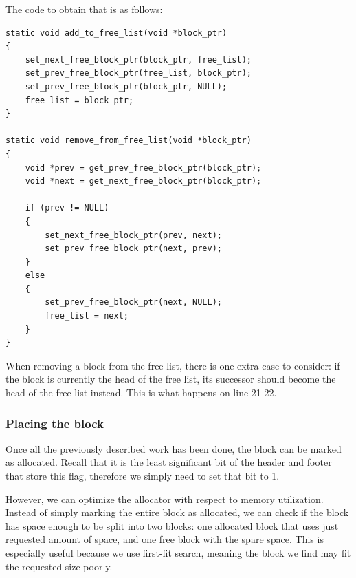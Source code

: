 The code to obtain that is as follows:

\bgroup
\small
\begin{verbatim}
static void add_to_free_list(void *block_ptr)
{
    set_next_free_block_ptr(block_ptr, free_list);
    set_prev_free_block_ptr(free_list, block_ptr);
    set_prev_free_block_ptr(block_ptr, NULL);
    free_list = block_ptr;
}

static void remove_from_free_list(void *block_ptr)
{
    void *prev = get_prev_free_block_ptr(block_ptr);
    void *next = get_next_free_block_ptr(block_ptr);

    if (prev != NULL)
    {
        set_next_free_block_ptr(prev, next);
        set_prev_free_block_ptr(next, prev);
    }
    else
    {
        set_prev_free_block_ptr(next, NULL);
        free_list = next;
    }
}
\end{verbatim}
\egroup

When removing a block from the free list, there is one extra case to consider: if the block is currently the head of the free list, its successor should become the head of the free list instead. This is what happens on line 21-22.

\subsubsection{Placing the block}
\label{sec:place-block}

Once all the previously described work has been done, the block can be marked as allocated. Recall that it is the least significant bit of the header and footer that store this flag, therefore we simply need to set that bit to 1.

However, we can optimize the allocator with respect to memory utilization. Instead of simply marking the entire block as allocated, we can check if the block has space enough to be split into two blocks: one allocated block that uses just requested amount of space, and one free block with the spare space. This is especially useful because we use first-fit search, meaning the block we find may fit the requested size poorly.


